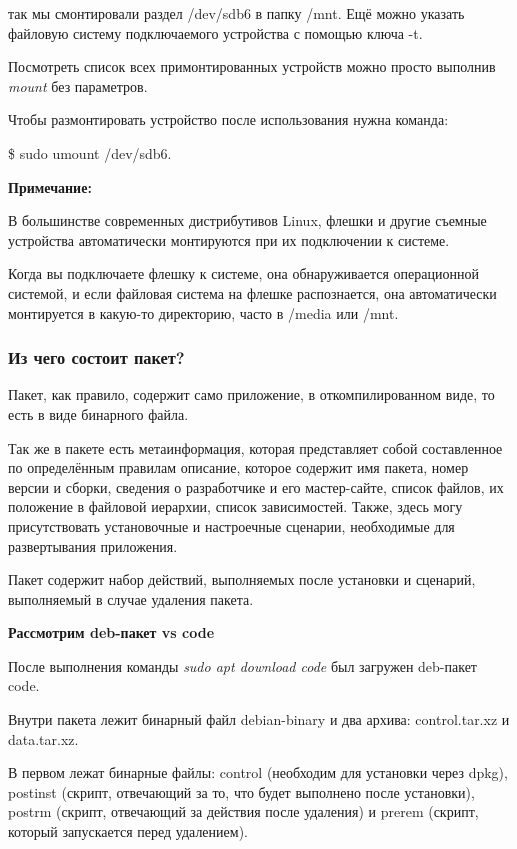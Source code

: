 \documentclass[oneside, final, 14pt]{extreport} %
\begin{document}
так мы смонтировали раздел /dev/sdb6 в папку /mnt. 
Ещё можно указать файловую систему подключаемого устройства с помощью ключа -t. 

Посмотреть список всех примонтированных устройств можно просто выполнив \textit{mount} без параметров.

Чтобы размонтировать устройство после использования нужна команда:

\$ sudo umount /dev/sdb6.

\textbf{Примечание:}

В большинстве современных дистрибутивов Linux, флешки и другие съемные устройства автоматически монтируются при их подключении к системе. 

Когда вы подключаете флешку к системе, она обнаруживается операционной системой, и если файловая система на флешке распознается, она автоматически монтируется в какую-то директорию, часто в /media или /mnt.



\subsubsection{Из чего состоит пакет?}

Пакет, как правило, содержит само приложение, в откомпилированном  виде, то есть в виде бинарного файла.

Так же в пакете есть метаинформация, которая представляет собой составленное по определённым правилам описание, которое содержит имя пакета, номер версии и сборки, сведения о разработчике и его мастер-сайте, список файлов, их положение в файловой иерархии, список зависимостей. Также, здесь могу присутствовать установочные и настроечные сценарии, необходимые для развертывания приложения.

Пакет содержит набор действий, выполняемых после установки и сценарий, выполняемый в случае удаления пакета.

\vspace*{\baselineskip}

\textbf{Рассмотрим deb-пакет vs code}

После выполнения команды \textit{sudo apt download code} 
был загружен deb-пакет code.

Внутри пакета лежит бинарный файл debian-binary и два архива: control.tar.xz и data.tar.xz.

В первом лежат бинарные файлы:
control (необходим для установки через dpkg), 
postinst (скрипт, отвечающий за то, что будет выполнено после установки), 
postrm (скрипт, отвечающий за действия после удаления) и prerem (скрипт, который запускается перед удалением). 
\end{document}
